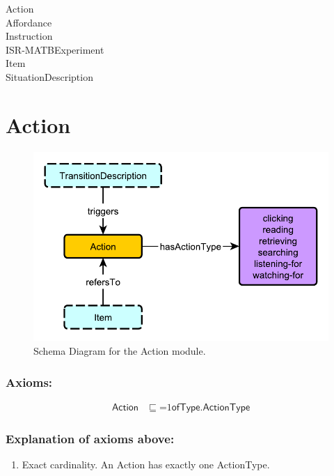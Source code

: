 \begin{description}
\item[Action]
\item[Affordance]
\item[Instruction]
\item[ISR-MATBExperiment]
\item[Item]
\item[SituationDescription]
\end{description}

\newpage
\section{Action}
\label{ssec:action}

\begin{figure}[h!]
\begin{center}
\includegraphics[width=.8\textwidth]{resources/Action.pdf}
\end{center}
\caption{Schema Diagram for the \textsf{Action} module.}
\label{fig:action}
\end{figure}

\subsubsection*{Axioms:}

\begin{align}
\textsf{Action} &\sqsubseteq \mathord{=}1\textsf{ofType.ActionType}
\end{align}

\subsubsection*{Explanation of axioms above:}

\begin{enumerate}
\item Exact cardinality. An \textsf{Action} has exactly one \textsf{ActionType}.
\end{enumerate}

